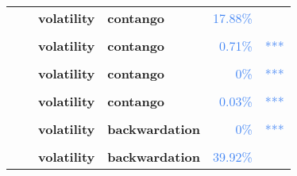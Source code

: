 \documentclass[
  authoryear,
  preprint,
  3p]{elsarticle}
\begin{document}
\begin{longtable}[t]{>{}l>{}l>{}l>{}l>{}r>{}r}
\textbf{} & \textbf{} & \textbf{volatility} & \textbf{contango} & \textcolor[HTML]{4285f4}{17.88\%} & \textcolor[HTML]{4285f4}{}\\
\textbf{\cellcolor{gray!10}{}} & \textbf{\cellcolor{gray!10}{financialisation}} & \textbf{\cellcolor{gray!10}{mean}} & \textbf{\cellcolor{gray!10}{contango}} & \textcolor[HTML]{4285f4}{\cellcolor{gray!10}{74.37\%}} & \textcolor[HTML]{4285f4}{\cellcolor{gray!10}{}}\\
\addlinespace
\textbf{} & \textbf{} & \textbf{volatility} & \textbf{contango} & \textcolor[HTML]{4285f4}{0.71\%} & \textcolor[HTML]{4285f4}{***}\\
\textbf{\cellcolor{gray!10}{}} & \textbf{\cellcolor{gray!10}{crisis}} & \textbf{\cellcolor{gray!10}{mean}} & \textbf{\cellcolor{gray!10}{backwardation}} & \textcolor[HTML]{4285f4}{\cellcolor{gray!10}{55.78\%}} & \textcolor[HTML]{4285f4}{\cellcolor{gray!10}{}}\\
\textbf{} & \textbf{} & \textbf{volatility} & \textbf{contango} & \textcolor[HTML]{4285f4}{0\%} & \textcolor[HTML]{4285f4}{\vphantom{15} ***}\\
\textbf{\cellcolor{gray!10}{}} & \textbf{\cellcolor{gray!10}{post-crisis}} & \textbf{\cellcolor{gray!10}{mean}} & \textbf{\cellcolor{gray!10}{backwardation}} & \textcolor[HTML]{4285f4}{\cellcolor{gray!10}{17.19\%}} & \textcolor[HTML]{4285f4}{\cellcolor{gray!10}{}}\\
\textbf{} & \textbf{} & \textbf{volatility} & \textbf{contango} & \textcolor[HTML]{4285f4}{0.03\%} & \textcolor[HTML]{4285f4}{\vphantom{1} ***}\\
\addlinespace
\textbf{\cellcolor{gray!10}{Gold (XCEC)}} & \textbf{\cellcolor{gray!10}{past}} & \textbf{\cellcolor{gray!10}{mean}} & \textbf{\cellcolor{gray!10}{backwardation}} & \textcolor[HTML]{4285f4}{\cellcolor{gray!10}{43.44\%}} & \textcolor[HTML]{4285f4}{\cellcolor{gray!10}{}}\\
\textbf{} & \textbf{} & \textbf{volatility} & \textbf{backwardation} & \textcolor[HTML]{4285f4}{0\%} & \textcolor[HTML]{4285f4}{***}\\
\textbf{\cellcolor{gray!10}{}} & \textbf{\cellcolor{gray!10}{financialisation}} & \textbf{\cellcolor{gray!10}{mean}} & \textbf{\cellcolor{gray!10}{contango}} & \textcolor[HTML]{4285f4}{\cellcolor{gray!10}{96.63\%}} & \textcolor[HTML]{4285f4}{\cellcolor{gray!10}{}}\\
\textbf{} & \textbf{} & \textbf{volatility} & \textbf{backwardation} & \textcolor[HTML]{4285f4}{39.92\%} & \textcolor[HTML]{4285f4}{}\\

\end{longtable}
\end{document}
